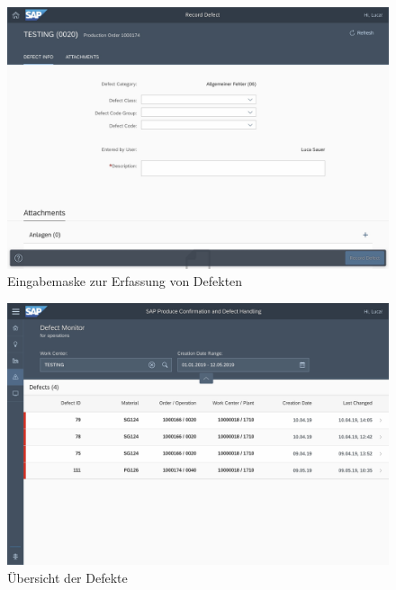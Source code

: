 \begin{figure}[H]
	\centering 
	\includegraphics[width=1.2\textwidth, angle =90 ]{img/defectrecord.jpg}	
	\caption[Eingabemaske zur Erfassung von Defekten]{\label{fig:Eingabemaske zur Erfassung von Defekten}Eingabemaske zur Erfassung von Defekten
	}
\end{figure}

\begin{figure}[H]
	\centering 
	\includegraphics[width=1.3\textwidth, angle =90 ]{img/defectmonit.jpg}	
	\caption[Übersicht der Defekte]{\label{fig:Übersicht der Defekte}Übersicht der Defekte
	}
\end{figure}
